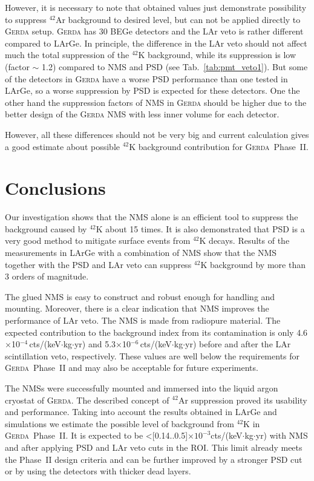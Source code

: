 \documentclass[twocolumn,epjc3]{svjour3}
\newcommand{\ctsper} {{cts/(keV\(\cdot\)kg\(\cdot\)yr)}}
\newcommand{\Gerda} {{\textsc{Gerda}\xspace}}
\newcommand{\LArGe} {{{LArGe}\xspace}}
\newcommand{\I}[2]{$^{#1}$#2}
\begin{document}
However, it is necessary to note that obtained values just demonstrate possibility to suppress \I{42}{Ar} background to desired level, but can not be applied directly to \Gerda{} setup. \Gerda{} has 30 BEGe detectors and the LAr veto is rather different compared to \LArGe{}. In principle, the difference in the LAr veto should not affect much the total suppression of the \I{42}{K} background, while its suppression is low (factor $\sim$ 1.2) compared to NMS and PSD (see Tab.~\ref{tab:pmt_veto1}). But some of the detectors in \Gerda{} have a worse PSD performance than one tested in \LArGe, so a worse suppression by PSD is expected for these detectors. One the other hand the suppression factors of NMS in \Gerda{} should be higher due to the better design of the \Gerda{} NMS with less inner volume for each detector.

However, all these differences should not be very big and current calculation gives a good estimate about possible $^{42}$K background contribution for \Gerda{}~Phase~II.

\section{Conclusions}
\label{sec:conclusions}
%
Our investigation shows that the NMS alone is an efficient tool to suppress the background caused by \I{42}{K} about 15 times. It is also demonstrated that PSD is a very good method to mitigate surface events from \I{42}{K} decays. Results of the measurements in \LArGe{} with a combination of NMS show that the NMS together with the PSD and LAr veto can suppress \I{42}{K} background by more than 3 orders of magnitude.
  
The glued NMS is easy to construct and robust enough for handling and mounting. Moreover, there is a clear indication that NMS improves the performance of LAr veto. The NMS is made from radiopure material. The expected contribution to the background index from its contamination is only 4.6$\times$10$^{-4}$\,\ctsper{} and 5.3$\times$10$^{-6}$\,\ctsper{} before and after the LAr scintillation veto, respectively. These values are well below the requirements for \Gerda{}~Phase~II and may also be acceptable for future experiments.

The NMSs were successfully mounted and immersed into the liquid argon cryostat of \Gerda{}. The described concept of \I{42}{Ar} suppression proved its usability and performance. Taking into account the results obtained in \LArGe{} and simulations we estimate the possible level of background from \I{42}{K} in \Gerda{}~Phase~II. It is expected to be \textless[0.14..0.5]\(\times 10^{-3}\)\ctsper{} with NMS and after applying PSD and LAr veto cuts in the ROI. This limit already meets the Phase~II design criteria and can be further improved by a stronger PSD cut or by using the detectors with thicker dead layers.
\end{document}
